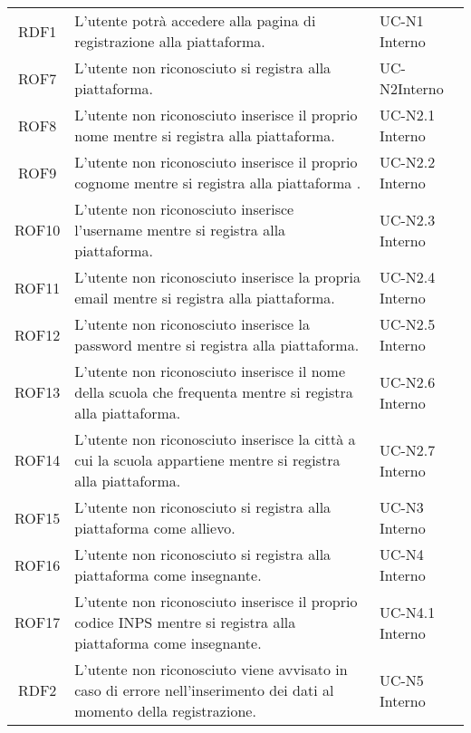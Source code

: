 \begin{tabularx}{\textwidth}{| c | p{10cm} | X |}
		RDF1 & L'utente potrà accedere alla pagina di registrazione alla piattaforma. & UC-N1 \newline Interno\\
		ROF7 & L'utente non riconosciuto si registra alla piattaforma. & UC-N2\newline Interno\\
		ROF8 & L'utente non riconosciuto inserisce il proprio nome mentre si registra alla piattaforma. & UC-N2.1 \newline Interno\\
		ROF9 & L'utente non riconosciuto inserisce il proprio cognome mentre si registra alla piattaforma . & UC-N2.2 \newline Interno\\
		ROF10 & L'utente non riconosciuto inserisce l'username mentre si registra alla piattaforma. & UC-N2.3 \newline Interno\\
		ROF11 & L'utente non riconosciuto inserisce la propria email mentre si registra alla piattaforma. & UC-N2.4 \newline Interno\\
		ROF12 & L'utente non riconosciuto inserisce la password mentre si registra alla piattaforma. & UC-N2.5 \newline Interno\\
		ROF13 & L'utente non riconosciuto inserisce il nome della scuola che frequenta mentre si registra alla piattaforma. & UC-N2.6 \newline Interno\\
		ROF14 & L'utente non riconosciuto inserisce la città a cui la scuola appartiene mentre si registra alla piattaforma. & UC-N2.7 \newline Interno\\
		ROF15 & L'utente non riconosciuto si registra alla piattaforma come allievo. & UC-N3 \newline Interno\\			
		ROF16 & L'utente non riconosciuto si registra alla piattaforma come insegnante. & UC-N4 \newline Interno\\
		ROF17 & L'utente non riconosciuto inserisce il proprio codice INPS mentre si registra alla piattaforma come insegnante. & UC-N4.1 \newline Interno\\
		RDF2 & L'utente non riconosciuto viene avvisato in caso di errore nell'inserimento dei dati al momento della registrazione. & UC-N5 \newline Interno\\

\end{tabularx}
